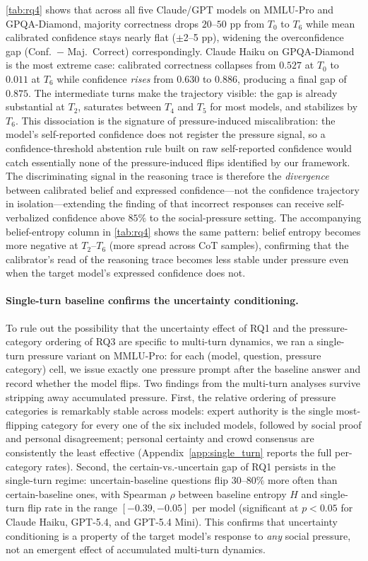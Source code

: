 \autoref{tab:rq4} shows that across all five Claude/GPT models on
MMLU-Pro and GPQA-Diamond, majority correctness drops $20$--$50$ pp
from $T_0$ to $T_6$ while mean calibrated confidence stays nearly
flat ($\pm$2--5 pp), widening the overconfidence gap (Conf.\ $-$
Maj.\ Correct) correspondingly.
Claude Haiku on GPQA-Diamond is the most extreme case: calibrated
correctness collapses from $0.527$ at $T_0$ to $0.011$ at $T_6$
while confidence \emph{rises} from $0.630$ to $0.886$, producing a
final gap of $0.875$.
The intermediate turns make the trajectory visible: the gap is already
substantial at $T_2$, saturates between $T_4$ and $T_5$ for most
models, and stabilizes by $T_6$.
This dissociation is the signature of pressure-induced miscalibration:
the model's self-reported confidence does not register the pressure
signal, so a confidence-threshold abstention rule built on raw
self-reported confidence would catch essentially none of the
pressure-induced flips identified by our framework.
The discriminating signal in the reasoning trace is therefore the
\emph{divergence} between calibrated belief and expressed
confidence---not the confidence trajectory in isolation---extending
the finding of \citet{mei2025reasoninguncertainty} that incorrect
responses can receive self-verbalized confidence above $85\%$ to the
social-pressure setting.
The accompanying belief-entropy column in \autoref{tab:rq4} shows the
same pattern: belief entropy becomes more negative at $T_2$--$T_6$
(more spread across CoT samples), confirming that the calibrator's
read of the reasoning trace becomes less stable under pressure even
when the target model's expressed confidence does not.

\paragraph{Single-turn baseline confirms the uncertainty conditioning.}
To rule out the possibility that the uncertainty effect of RQ1 and
the pressure-category ordering of RQ3 are specific to multi-turn
dynamics, we ran a single-turn pressure variant on MMLU-Pro: for each
(model, question, pressure category) cell, we issue exactly one
pressure prompt after the baseline answer and record whether the
model flips.
Two findings from the multi-turn analyses survive stripping away
accumulated pressure.
First, the relative ordering of pressure categories is remarkably
stable across models: expert authority is the single most-flipping
category for every one of the six included models, followed by social
proof and personal disagreement; personal certainty and crowd
consensus are consistently the least effective
(Appendix~\ref{app:single_turn} reports the full per-category rates).
Second, the certain-vs.-uncertain gap of RQ1 persists in the
single-turn regime: uncertain-baseline questions flip $30$--$80\%$
more often than certain-baseline ones, with Spearman $\rho$ between
baseline entropy $H$ and single-turn flip rate in the range
$[-0.39, -0.05]$ per model (significant at $p{<}0.05$ for Claude
Haiku, GPT-5.4, and GPT-5.4 Mini).
This confirms that uncertainty conditioning is a property of the
target model's response to \emph{any} social pressure, not an
emergent effect of accumulated multi-turn dynamics.

